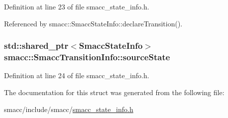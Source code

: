 Definition at line 23 of file smacc\+\_\+state\+\_\+info.\+h.



Referenced by smacc\+::\+Smacc\+State\+Info\+::declare\+Transition().

\subsubsection[{\texorpdfstring{source\+State}{sourceState}}]{\setlength{\rightskip}{0pt plus 5cm}std\+::shared\+\_\+ptr$<${\bf Smacc\+State\+Info}$>$ smacc\+::\+Smacc\+Transition\+Info\+::source\+State}\hypertarget{structsmacc_1_1SmaccTransitionInfo_a959ee5f468cba2f7b19e4d35f94cc564}{}\label{structsmacc_1_1SmaccTransitionInfo_a959ee5f468cba2f7b19e4d35f94cc564}


Definition at line 24 of file smacc\+\_\+state\+\_\+info.\+h.



The documentation for this struct was generated from the following file\+:\begin{DoxyCompactItemize}
\item 
smacc/include/smacc/\hyperlink{smacc__state__info_8h}{smacc\+\_\+state\+\_\+info.\+h}\end{DoxyCompactItemize}
